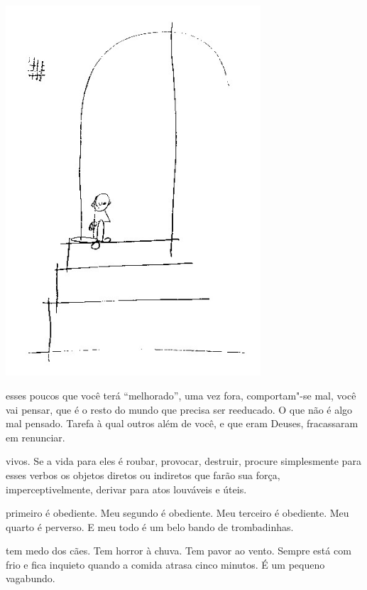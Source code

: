 \begin{vplace}[.50]
\begin{center}
\includegraphics[width=95mm]{./imgs/Image_11.jpg}
\end{center}
\end{vplace}

\pagebreak
\thispagestyle{empty}

\movetooddpage

 esses poucos que você terá ``melhorado'', uma vez fora, comportam"-se
mal, você vai pensar, que é o resto do mundo que precisa ser reeducado.
O que não é algo mal pensado. Tarefa à qual outros além de você, e que
eram Deuses, fracassaram em renunciar.



 vivos. Se a vida para eles é roubar, provocar, destruir,
procure simplesmente para esses verbos os objetos diretos ou indiretos
que farão sua força, imperceptivelmente, derivar para atos louváveis e
úteis.



 primeiro é obediente. Meu segundo é obediente. Meu terceiro é
obediente. Meu quarto é perverso. E meu todo é um belo bando de
trombadinhas.



 tem medo dos cães. Tem horror à chuva. Tem pavor ao vento. Sempre
está com frio e fica inquieto quando a comida atrasa cinco minutos. É um
pequeno vagabundo.



